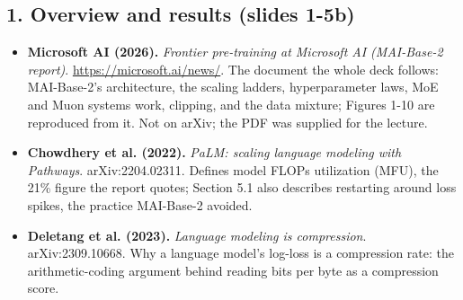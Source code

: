 \documentclass[11pt,letterpaper]{article}
\begin{document}
\subsection*{1. Overview and results (slides 1-5b)}
\begin{itemize}[leftmargin=1.2em,itemsep=3pt]\sloppy
\item \textbf{Microsoft AI (2026).} \textit{Frontier pre-training at Microsoft AI (MAI-Base-2 report)}. \url{https://microsoft.ai/news/}. The document the whole deck follows: MAI-Base-2's architecture, the scaling ladders, hyperparameter laws, MoE and Muon systems work, clipping, and the data mixture; Figures 1-10 are reproduced from it. Not on arXiv; the PDF was supplied for the lecture.
\item \textbf{Chowdhery et al. (2022).} \textit{PaLM: scaling language modeling with Pathways}. arXiv:2204.02311. Defines model FLOPs utilization (MFU), the 21\% figure the report quotes; Section 5.1 also describes restarting around loss spikes, the practice MAI-Base-2 avoided.
\item \textbf{Deletang et al. (2023).} \textit{Language modeling is compression}. arXiv:2309.10668. Why a language model's log-loss is a compression rate: the arithmetic-coding argument behind reading bits per byte as a compression score.
\end{itemize}
\end{document}
